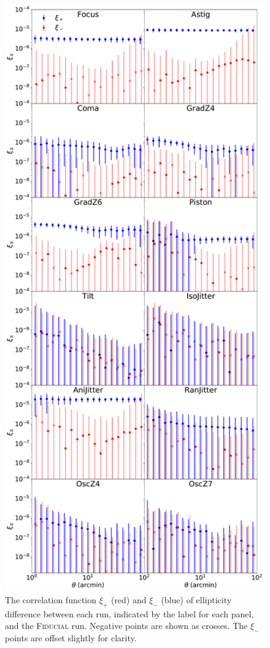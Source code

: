 \documentclass[aps,prd, amsmath,amssymb,superscriptaddress,showkeys,nofootinbib,reprint,preprintnumbers]{revtex4-1}
\begin{document}
\begin{figure}
\begin{center}
\includegraphics[width=\columnwidth]{figures/2pt_corrs.pdf}
\end{center}
\caption[]{ The correlation function $\xi_+$ (red) and $\xi_-$ (blue) of ellipticity difference between each run, indicated by the label for each panel, and the \textsc{Fiducial} run. Negative points are shown as crosses. The $\xi_-$ points are offset slightly for clarity.
\label{fig:f2pt_corrs}}
\end{figure}
\end{document}
